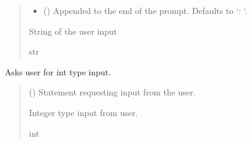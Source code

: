 \documentclass[letterpaper,10pt,english]{sphinxmanual}
\begin{document}
\begin{fulllineitems}
\begin{fulllineitems}
\begin{quote}
\begin{description}
\begin{itemize}
\item {} 
\sphinxAtStartPar
{} (\sphinxstyleliteralemphasis{\sphinxupquote{, }}) \textendash{} Appended to the end of the prompt. Defaults to ‘: ‘.

\end{itemize}

\sphinxAtStartPar
String of the user input

\sphinxAtStartPar
str

\end{description}\end{quote}

\end{fulllineitems}


\begin{fulllineitems}
\label{\detokenize{GetUserInput:GetUserInput.UserInput.AskForInt}}
\pysigstartsignatures
{}
\pysigstopsignatures
\sphinxAtStartPar
Asks user for int type input.
\begin{quote}\begin{description}
\sphinxAtStartPar
{} () \textendash{} Statement requesting input from the user.

\sphinxAtStartPar
Integer type input from user.

\sphinxAtStartPar
int

\end{description}\end{quote}

\end{fulllineitems}



\end{fulllineitems}
\end{document}
